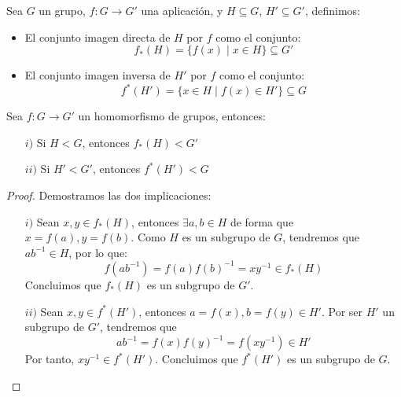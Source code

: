 \begin{definicion}
    Sea $G$ un grupo, $f:G\to G'$ una aplicación, y $H\subseteq G$, $H'\subseteq G'$, definimos:
    \begin{itemize}
        \item El conjunto imagen directa de $H$ por $f$ como el conjunto:
            \begin{equation*}
                f_\ast(H) = \{f(x) \mid x\in H\}\subseteq G'
            \end{equation*}
        \item El conjunto imagen inversa de $H'$ por $f$ como el conjunto:
            \begin{equation*}
                f^\ast(H') = \{x\in H \mid f(x) \in H'\}\subseteq G
            \end{equation*}
    \end{itemize}
\end{definicion}

\begin{prop}
    Sea $f:G\to G'$ un homomorfismo de grupos, entonces: 
    \begin{enumerate}
        \item[$i)$] Si $H<G$, entonces $f_\ast(H)< G'$ 
        \item[$ii)$] Si $H'<G'$, entonces $f^\ast(H')< G$
    \end{enumerate}
    \begin{proof}
        Demostramos las dos implicaciones:
        \begin{enumerate}
            \item[$i)$] Sean $x,y\in f_\ast(H)$, entonces $\exists a,b\in H$ de forma que $x=f(a), y=f(b)$. Como $H$ es un subgrupo de $G$, tendremos que $ab^{-1}\in H$, por lo que:
            $$f(ab^{-1}) = f(a){f(b)}^{-1} = xy^{-1}\in f_\ast(H)$$
            Concluimos que $f_\ast(H)$ es un subgrupo de $G'$.
            \item[$ii)$] Sean $x,y\in f^\ast(H')$, entonces $a=f(x), b=f(y)\in H'$. Por ser $H'$ un subgrupo de $G'$, tendremos que
            $$ab^{-1} = f(x){f(y)}^{-1}=f(xy^{-1})\in H'$$
            Por tanto, ${xy^{-1}\in f^\ast(H')}$. Concluimos que $f^\ast(H')$ es un subgrupo de $G$.
        \end{enumerate}
    \end{proof}
\end{prop}

